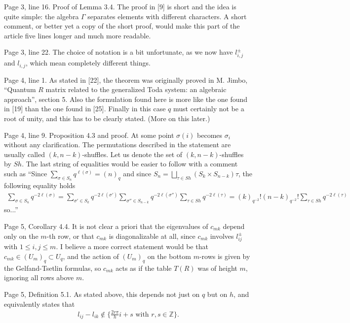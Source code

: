 \documentclass[11pt,fleqn]{article}
\newcommand\ZZ{\mathbb Z}
\begin{document}
Page 3, line 16. Proof of Lemma 3.4. The proof in [9] is short and the idea is
quite simple: the algebra $\Gamma$ separates elements with different 
characters. A short comment, or better yet a copy of the short proof, would 
make this part of the article five lines longer and much more readable.

Page 3, line 22. The choice of notation is a bit unfortunate, as we now have
$l_{i,j}^\pm$ and $l_{i,j}$, which mean completely different things.

Page 4, line 1. As stated in [22], the theorem was originally proved in M. 
Jimbo, ``Quantum $R$ matrix related to the generalized Toda system: an 
algebraic approach'', section 5. Also the formulation found here is more like
the one found in [19] than the one found in [25]. Finally in this case $q$
must certainly not be a root of unity, and this has to be clearly stated.
(More on this later.) 

Page 4, line 9. Proposition 4.3 and proof. At some point $\sigma(i)$ becomes 
$\sigma_i$ without any clarification. The permutations described in the 
statement are usually called $(k,n-k)$-shuffles. Let us denote the set of 
$(k,n-k)$-shuffles by $Sh$. The last string of equalities would be easier to 
follow with a comment such as ``Since $\sum_{\sigma \in S_n} q^{\ell(\sigma)} 
= (n)_q$ and since $S_n = \bigsqcup_{\tau \in Sh} (S_k \times S_{n-k})\tau$, 
the following equality holds
\begin{align*}
\sum_{\sigma \in S_n} q^{-2\ell(\sigma)} 
	= \sum_{\sigma' \in S_k} q^{-2\ell(\sigma')} 
	\sum_{\sigma'' \in S_{n-k}} q^{-2\ell(\sigma'')}
	\sum_{\tau \in Sh} q^{-2\ell(\tau)}
	= (k)_{q^{-2}}! (n-k)_{q^{-2}}! \sum_{\tau \in Sh} q^{-2\ell(\tau)}
\end{align*}
so...''

Page 5, Corollary 4.4. It is not clear a priori that the eigenvalues of 
$c_{mk}$ depend only on the $m$-th row, or that $c_{mk}$ is diagonalizable at 
all, since $c_{mk}$ involves $l_{ij}^\pm$ with $1 \leq i,j \leq m$. I believe
a more correct statement would be that $c_{mk} \in (U_m)_q \subset U_q$, and 
the action of $(U_m)_q$ on the bottom $m$-rows is given by the Gelfand-Tsetlin
formulas, so $c_{mk}$ acts as if the table $T(R)$ was of height $m$, ignoring
all rows above $m$.

Page 5, Definition 5.1. As stated above, this depends not just on $q$ but on 
$h$, and equivalently states that
\begin{align*}
l_{ij} - l_{ik} \notin \{\frac{2r\pi}{h}i + s \mbox{ with } r,s \in \ZZ\}.
\end{align*}
\end{document}
